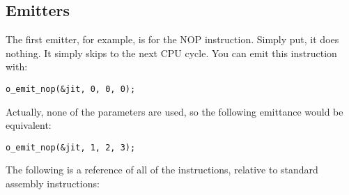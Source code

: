 \documentclass[10pt,a4paper]{article}
\begin{document}
\subsection{Emitters}
The first emitter, for example, is for the NOP instruction. Simply put, it does nothing. It simply skips to the next CPU cycle. You can emit this instruction with:
\begin{verbatim}
o_emit_nop(&jit, 0, 0, 0);
\end{verbatim}

Actually, none of the parameters are used, so the following emittance would be equivalent:
\begin{verbatim}
o_emit_nop(&jit, 1, 2, 3);
\end{verbatim}

The following is a reference of all of the instructions, relative to standard assembly instructions:
\end{document}
